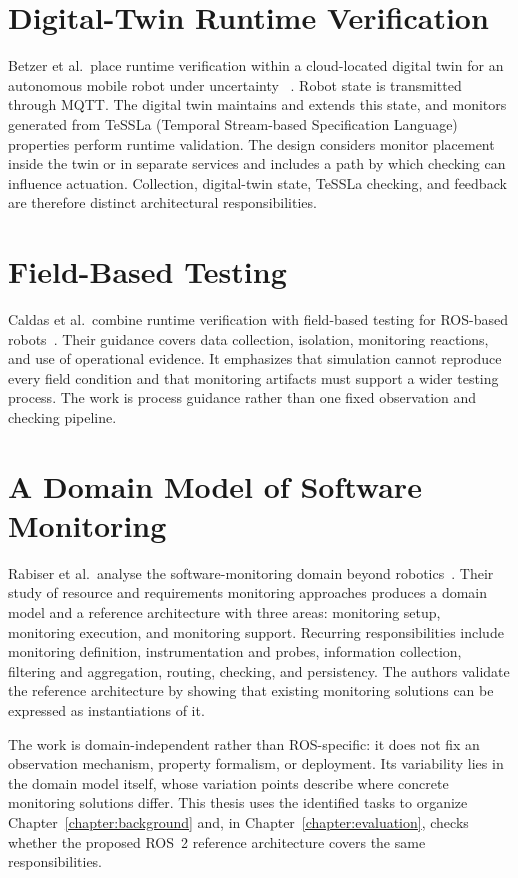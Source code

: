 \section{Digital-Twin Runtime Verification}

Betzer et al.\ place runtime verification within a cloud-located digital twin
for an autonomous mobile robot under uncertainty
~\cite{betzer2024digitaltwinrv}. Robot state is transmitted through MQTT. The
digital twin maintains and extends this state, and monitors generated from
TeSSLa (Temporal Stream-based Specification Language) properties perform
runtime validation. The design considers monitor placement inside the twin or
in separate services and includes a path by which checking can influence
actuation. Collection, digital-twin state, TeSSLa checking, and feedback are
therefore distinct architectural responsibilities.

\section{Field-Based Testing}

Caldas et al.\ combine runtime verification with field-based testing for
ROS-based robots~\cite{caldas2024runtime}. Their guidance covers data
collection, isolation, monitoring reactions, and use of operational evidence.
It emphasizes that simulation cannot reproduce every field condition and that
monitoring artifacts must support a wider testing process. The work is process
guidance rather than one fixed observation and checking pipeline.

\section{A Domain Model of Software Monitoring}

Rabiser et al.\ analyse the software-monitoring domain beyond
robotics~\cite{rabiser2019domain}. Their study of resource and requirements
monitoring approaches produces a domain model and a reference architecture
with three areas: monitoring setup, monitoring execution, and monitoring
support. Recurring responsibilities include monitoring definition,
instrumentation and probes, information collection, filtering and
aggregation, routing, checking, and persistency. The authors validate the
reference architecture by showing that existing monitoring solutions can be
expressed as instantiations of it.

The work is domain-independent rather than ROS-specific: it does not fix an
observation mechanism, property formalism, or deployment. Its variability lies
in the domain model itself, whose variation points describe where concrete
monitoring solutions differ. This thesis uses the identified tasks to organize
Chapter~\ref{chapter:background} and, in Chapter~\ref{chapter:evaluation},
checks whether the proposed ROS~2 reference architecture covers the same
responsibilities.

